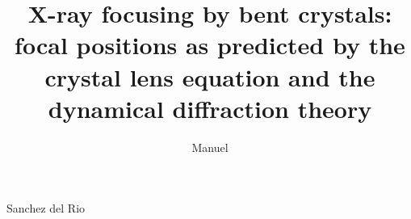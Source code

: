 \documentclass[preprint]{iucr}              %
\begin{document}



\title{X-ray focusing by bent crystals: focal positions as predicted by the crystal lens equation and the dynamical diffraction theory}
%


\author[a]{Manuel}{Sanchez del Rio}











\end{document}
